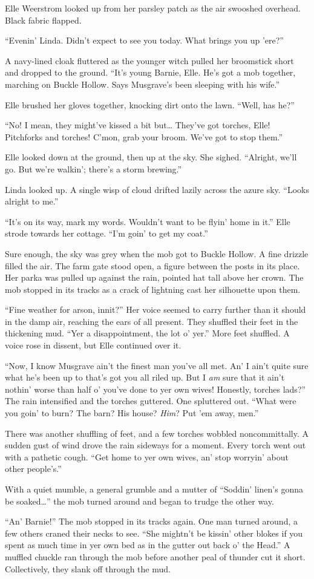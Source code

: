 Elle Weerstrom looked up from her parsley patch as the air swooshed overhead.
Black fabric flapped.

``Evenin' Linda.
Didn't expect to see you today.
What brings you up 'ere?''

A navy-lined cloak fluttered as the younger witch pulled her broomstick short and dropped to the ground.
``It's young Barnie, Elle.
He's got a mob together, marching on Buckle Hollow.
Says Musgrave's been sleeping with his wife.''

Elle brushed her gloves together, knocking dirt onto the lawn.
``Well, has he?''

``No!
I mean, they might've kissed a bit but{\dots}
They've got torches, Elle!
Pitchforks and torches!
C'mon, grab your broom.
We've got to stop them.''

Elle looked down at the ground, then up at the sky.
She sighed.
``Alright, we'll go.
But we're walkin'; there's a storm brewing.''

Linda looked up.
A single wisp of cloud drifted lazily across the azure sky.
``Looks alright to me.''

``It's on its way, mark my words.
Wouldn't want to be flyin' home in it.''
Elle strode towards her cottage.
``I'm goin' to get my coat.''

\storybreak

Sure enough, the sky was grey when the mob got to Buckle Hollow.
A fine drizzle filled the air.
The farm gate stood open, a figure between the posts in its place.
Her parka was pulled up against the rain, pointed hat tall above her crown.
The mob stopped in its tracks as a crack of lightning cast her silhouette upon them.

``Fine weather for arson, innit?''
Her voice seemed to carry further than it should in the damp air, reaching the ears of all present.
They shuffled their feet in the thickening mud.
``Yer a disappointment, the lot o' yer.''
More feet shuffled.
A voice rose in dissent, but Elle continued over it.

``Now, I know Musgrave ain't the finest man you've all met.
An' I ain't quite sure what he's been up to that's got you all riled up.
But I \emph{am} sure that it ain't nothin' worse than half o' you've done to yer own wives!
Honestly, torches lads?''
The rain intensified and the torches guttered.
One spluttered out.
``What were you goin' to burn?
The barn?
His house?
\emph{Him}?
Put 'em away, men.''

There was another shuffling of feet, and a few torches wobbled noncommittally.
A sudden gust of wind drove the rain sideways for a moment.
Every torch went out with a pathetic cough.
``Get home to yer own wives, an' stop worryin' about other people's.''

With a quiet mumble, a general grumble and a mutter of ``Soddin' linen's gonna be soaked{\dots}'' the mob turned around and began to trudge the other way.

``An' Barnie!''
The mob stopped in its tracks again.
One man turned around, a few others craned their necks to see.
``She mightn't be kissin' other blokes if you spent as much time in yer own bed as in the gutter out back o' the Head.''
A muffled chuckle ran through the mob before another peal of thunder cut it short.
Collectively, they slank off through the mud.
